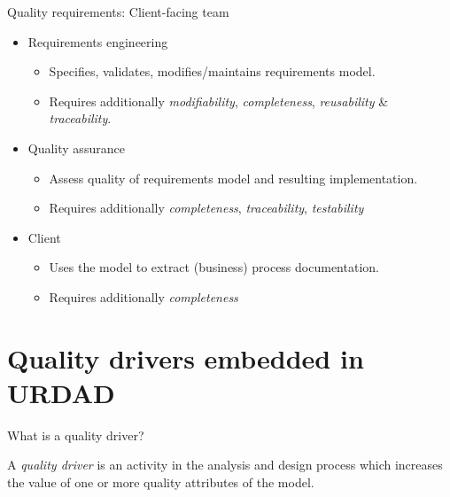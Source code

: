 \documentclass[xcolor=svgnames]{beamer}
\begin{document}
\begin{frame}{Quality requirements: Client-facing team}
  \begin{itemize} 
    \item<+-| alert@+> Requirements engineering
      \begin{itemize}
	\item Specifies, validates, modifies/maintains requirements model.
	\item Requires additionally {\em modifiability}, {\em completeness}, {\em reusability} \& {\em traceability}.
      \end{itemize}
    \item<+-| alert@+> Quality assurance
      \begin{itemize}
	\item Assess quality of requirements model and resulting implementation.
	\item Requires additionally {\em completeness}, {\em traceability}, {\em testability}
      \end{itemize}
    \item<+-| alert@+> Client
      \begin{itemize}
	\item Uses the model to extract (business) process documentation.
	\item Requires additionally {\em completeness}
      \end{itemize}
  \end{itemize}
\end{frame}


\section{Quality drivers embedded in URDAD}

\begin{frame}{What is a quality driver?}
  \begin{definition}
    A {\em quality driver} is an activity in the analysis and design process which increases the value of one or more quality attributes of the model.
  \end{definition}
\end{frame}


\end{document}
